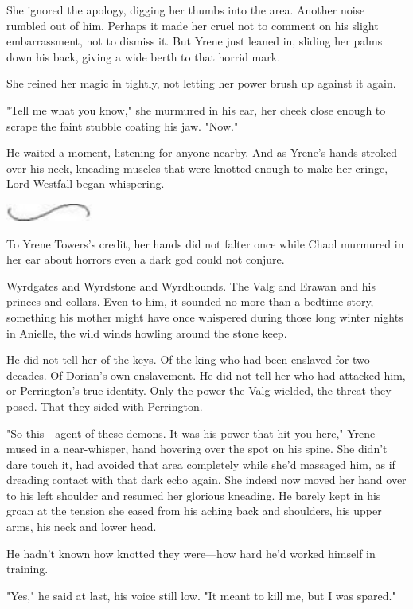 She ignored the apology, digging her thumbs into the area. Another noise rumbled out of him. Perhaps it made her cruel not to comment on his slight embarrassment, not to dismiss it. But Yrene just leaned in, sliding her palms down his back, giving a wide berth to that horrid mark.

She reined her magic in tightly, not letting her power brush up against it again.

"Tell me what you know," she murmured in his ear, her cheek close enough to scrape the faint stubble coating his jaw. "Now."

He waited a moment, listening for anyone nearby. And as Yrene's hands stroked over his neck, kneading muscles that were knotted enough to make her cringe, Lord Westfall began whispering.

\includegraphics[width=1.12in,height=0.24in]{images/seperator}

To Yrene Towers's credit, her hands did not falter once while Chaol murmured in her ear about horrors even a dark god could not conjure.

Wyrdgates and Wyrdstone and Wyrdhounds. The Valg and Erawan and his princes and collars. Even to him, it sounded no more than a bedtime story, something his mother might have once whispered during those long winter nights in Anielle, the wild winds howling around the stone keep.

He did not tell her of the keys. Of the king who had been enslaved for two decades. Of Dorian's own enslavement. He did not tell her who had attacked him, or Perrington's true identity. Only the power the Valg wielded, the threat they posed. That they sided with Perrington.

"So this---agent of these  demons. It was his power that hit you here," Yrene mused in a near-whisper, hand hovering over the spot on his spine. She didn't dare touch it, had avoided that area completely while she'd massaged him, as if dreading contact with that dark echo again. She indeed now moved her hand over to his left shoulder and resumed her glorious kneading. He barely kept in his groan at the tension she eased from his aching back and shoulders, his upper arms, his neck and lower head.

He hadn't known how knotted they were---how hard he'd worked himself in training.

"Yes," he said at last, his voice still low. "It meant to kill me, but  I was spared."

